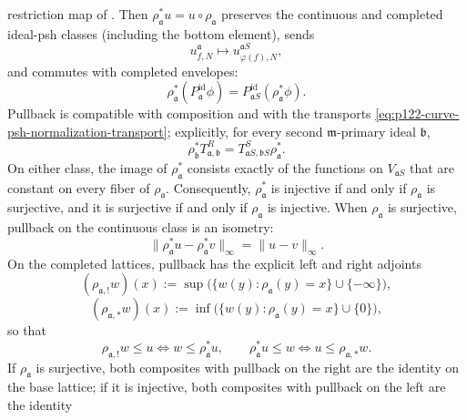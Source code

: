 \begin{theorem}
\begin{enumerate}
      restriction map of .  Then
      \(\rho_{\mathfrak a}^*u=u\circ\rho_{\mathfrak a}\) preserves the
      continuous and completed ideal-psh classes (including the bottom
      element), sends
      \[
                u^{\mathfrak a}_{f,N}
                    \longmapsto
                u^{\mathfrak aS}_{\varphi(f),N},
      \]
      and commutes with completed envelopes:
      \[
       \rho_{\mathfrak a}^*
          (P^{\mathrm{id}}_{\mathfrak a}\phi)
        =P^{\mathrm{id}}_{\mathfrak aS}
          (\rho_{\mathfrak a}^*\phi).
       \tag{\(\spadesuit\)}\label{eq:p123-curve-psh-finite-map-envelope}
      \]
      Pullback is compatible with composition and with the transports
      \eqref{eq:p122-curve-psh-normalization-transport}; explicitly, for
      every second \(\mathfrak m\)-primary ideal \(\mathfrak b\),
      \[
       \rho_{\mathfrak b}^*T^R_{\mathfrak a,\mathfrak b}
          =T^S_{\mathfrak aS,\mathfrak bS}
             \rho_{\mathfrak a}^*.
      \tag{\(\bigstar\)}\label{eq:p122-curve-psh-map-normalization-square}
      \]
      On either class, the image of \(\rho_{\mathfrak a}^*\) consists
      exactly of the functions on \(V_{\mathfrak aS}\) that are constant on
      every fiber of \(\rho_{\mathfrak a}\).  Consequently,
      \(\rho_{\mathfrak a}^*\) is injective if and only if
      \(\rho_{\mathfrak a}\) is surjective, and it is surjective if and only
      if \(\rho_{\mathfrak a}\) is injective.  When
      \(\rho_{\mathfrak a}\) is surjective, pullback on the continuous class
      is an isometry:
      \[
       \|\rho_{\mathfrak a}^*u-\rho_{\mathfrak a}^*v\|_\infty
          =\|u-v\|_\infty.
      \]
      On the completed lattices, pullback has the explicit left and right
      adjoints
      \[
       (\rho_{\mathfrak a,!}w)(x)
          :=\sup\bigl(\{w(y):\rho_{\mathfrak a}(y)=x\}
                        \cup\{-\infty\}\bigr),
      \]
      \[
       (\rho_{\mathfrak a,*}w)(x)
          :=\inf\bigl(\{w(y):\rho_{\mathfrak a}(y)=x\}
                        \cup\{0\}\bigr),
      \]
      so that
      \[
       \rho_{\mathfrak a,!}w\leq u
          \Longleftrightarrow
       w\leq\rho_{\mathfrak a}^*u,
       \qquad
       \rho_{\mathfrak a}^*u\leq w
          \Longleftrightarrow
       u\leq\rho_{\mathfrak a,*}w.
       \tag{\(\heartsuit\)}\label{eq:p122-curve-psh-finite-map-adjoints}
      \]
      If \(\rho_{\mathfrak a}\) is surjective, both composites with
      pullback on the right are the identity on the base lattice; if it is
      injective, both composites with pullback on the left are the identity

\end{enumerate}
\end{theorem}
